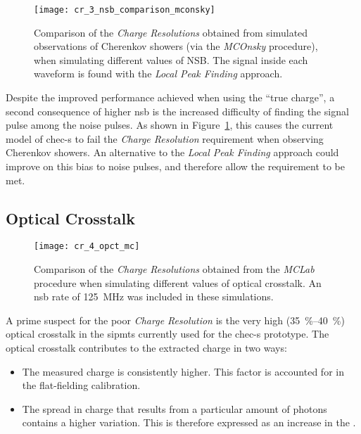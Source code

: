 \begin{figure}
	\centering
    \texttt{[image: cr\_3\_nsb\_comparison\_mconsky]} 
	\caption[Comparison of the \textit{Charge Resolution} at two different NSBs when observing Cherenkov showers (via the\textit{MCOnsky} procedure).]{Comparison of the \textit{Charge Resolutions} obtained from simulated observations of Cherenkov showers (via the \textit{MCOnsky} procedure), when simulating different values of NSB. The signal inside each waveform is found with the \textit{Local Peak Finding} approach.}
	\label{fig:cr_3_nsb_comparison_mconsky}
\end{figure}

Despite the improved performance achieved when using the ``true charge'', a second consequence of higher \gls{nsb} is the increased difficulty of finding the signal pulse among the noise pulses. As shown in Figure~\ref{fig:cr_3_nsb_comparison_mconsky}, this causes the current model of \gls{chec-s} to fail the \textit{Charge Resolution} requirement when observing Cherenkov showers. An alternative to the \textit{Local Peak Finding} approach could improve on this bias to noise pulses, and therefore allow the requirement to be met.

\subsection{Optical Crosstalk}

\begin{figure}[H]
	\centering
    \texttt{[image: cr\_4\_opct\_mc]} 
	\caption[Comparison of the \textit{Charge Resolution} at different values of optical crosstalk.]{Comparison of the \textit{Charge Resolutions} obtained from the \textit{MCLab} procedure when simulating different values of optical crosstalk. An \gls{nsb} rate of \SI{125}{MHz} was included in these simulations.}
	\label{fig:cr_4_opct_mc}
\end{figure}

A prime suspect for the poor \textit{Charge Resolution} is the very high (\SIrange{35}{40}{\percent}) optical crosstalk in the \glspl{sipmt} currently used for the \gls{chec-s} prototype. The optical crosstalk contributes to the extracted charge in two ways: 
\begin{itemize}
\item The measured charge is consistently higher. This factor is accounted for in the flat-fielding calibration.
\item The spread in charge that results from a particular amount of photons contains a higher variation. This is therefore expressed as an increase in the .
\end{itemize}

